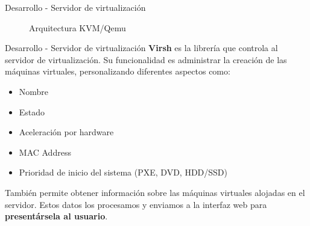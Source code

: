 \begin{frame}{Desarrollo - Servidor de virtualización}
\begin{figure}[!tbp]
\begin{minipage}[b]{0.5\textwidth}
        \caption{\scriptsize Arquitectura KVM/Qemu}
      \end{minipage}
    \end{figure}


\end{frame}


\begin{frame}{Desarrollo - Servidor de virtualización}
    \vspace{0cm}
    \textbf{Virsh} es la librería que controla al servidor de virtualización. Su funcionalidad es administrar la creación de las máquinas virtuales, personalizando diferentes aspectos como:
        \begin{itemize}
            \item Nombre
            \item Estado
            \item Aceleración por hardware
            \item MAC Address
            \item Prioridad de inicio del sistema (PXE, DVD, HDD/SSD)
        \end{itemize}
    También permite obtener información sobre las máquinas virtuales alojadas en el servidor. Estos datos los procesamos y enviamos a la interfaz web para \textbf{presentársela al usuario}.

\end{frame}


